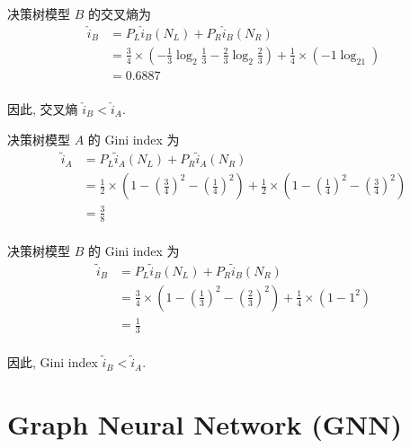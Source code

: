 \documentclass{article}
\begin{document}
决策树模型 $B$ 的交叉熵为
\begin{equation}
  \begin{aligned}
    \hat{i}_B
    &=P_L\hat{i}_B(N_L)+P_R\hat{i}_B(N_R)\\
    &=\frac{3}{4}\times\left(-\frac{1}{3}\log_2\frac{1}{3}-\frac{2}{3}\log_2\frac{2}{3}\right)+\frac{1}{4}\times\left(-1\log_21\right)\\
    &=0.6887\\
  \end{aligned}
\end{equation}

因此, 交叉熵 $\hat{i}_B < \hat{i}_A$.

决策树模型 $A$ 的 Gini index 为
\begin{equation}
  \begin{aligned}
    \tilde{i}_A
    &=P_L\tilde{i}_A(N_L)+P_R\tilde{i}_A(N_R)\\
    &=\frac{1}{2}\times\left(1-\left(\frac{3}{4}\right)^2-\left(\frac{1}{4}\right)^2\right)+\frac{1}{2}\times\left(1-\left(\frac{1}{4}\right)^2-\left(\frac{3}{4}\right)^2\right)\\
    &=\frac{3}{8}\\
  \end{aligned}
\end{equation}
 
决策树模型 $B$ 的 Gini index 为
\begin{equation}
  \begin{aligned}
    \tilde{i}_B
    &=P_L\tilde{i}_B(N_L)+P_R\tilde{i}_B(N_R)\\
    &=\frac{3}{4}\times\left(1-\left(\frac{1}{3}\right)^2-\left(\frac{2}{3}\right)^2\right)+\frac{1}{4}\times(1-1^2)\\
    &=\frac{1}{3}\\
  \end{aligned}
\end{equation}

因此, Gini index $\tilde{i}_B < \tilde{i}_A$.

\section*{Graph Neural Network (GNN)}

\end{document}
